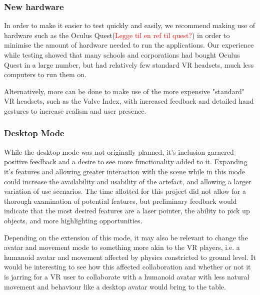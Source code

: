 
\subsubsection{New hardware}
In order to make it easier to test quickly and easily, we recommend making use of hardware such as the Oculus Quest(\textcolor{red}{Legge til en ref til quest?}) in order to minimise the amount of hardware needed to run the applications. Our experience while testing showed that many schools and corporations had bought Oculus Quest in a large number, but had relatively few standard VR headsets, much less computers to run them on. 

Alternatively, more can be done to make use of the more expensive "standard" VR headsets, such as the Valve Index, with increased feedback and detailed hand gestures to increase realism and user presence.

\subsubsection{Desktop Mode}
While the desktop mode was not originally planned, it's inclusion garnered positive feedback and a desire to see more functionality added to it. Expanding it's features and allowing greater interaction with the scene while in this mode could increase the availability and usability of the artefact, and allowing a larger variation of use scenarios. The time allotted for this project did not allow for a thorough examination of potential features, but preliminary feedback would indicate that the most desired features are a laser pointer, the ability to pick up objects, and more highlighting opportunities.

Depending on the extension of this mode, it may also be relevant to change the avatar and movement mode to something more akin to the VR players, i.e. a humanoid avatar and movement affected by physics constricted to ground level. It would be interesting to see how this affected collaboration and whether or not it is jarring for a VR user to collaborate with a humanoid avatar with less natural movement and behaviour like a desktop avatar would bring to the table.


\cleardoublepage